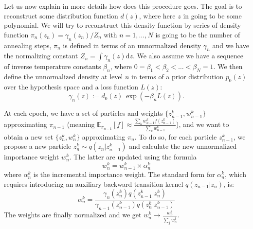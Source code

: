 \documentclass[11pt]{article}
\begin{document}
		Let us now explain in more details how does this procedure goes. The goal is to reconstruct some distribution function $d(z)$, where here $z$ in going to be some polynomial. We will try to reconstruct this density function by series of density function $\pi_n(z_n) = \gamma_n(z_n)/Z_n$ with $n = 1,\dots,N$ is going to be the number of annealing steps, $\pi_n$ is defined in terms of an unnormalized density $\gamma_n$ and we have the normalizing constant $Z_n = \int \gamma_n(z) \mathrm{d}z$. We also assume we have a sequence of inverse temperature constants $\beta_n$, where $0 = \beta_1 < \beta_2 <\dots< \beta_N = 1$. We then define the unnormalized density at level $n$ in terms of a prior distribution $p_0(z)$ over the hypothesis space and a loss function $L(z)$:
		\begin{equation}\label{eq:gamman}
			\gamma_n(z) := d_0(z) \: \exp \left( -\beta_n L(z) \right).
		\end{equation} 
		
		At each epoch, we have a set of particles and weights $\{z_{n-1}^k, w_{n-1}^k\}$ approximating $\pi_{n-1}$ (meaning $\mathbb{E}_{\pi_{n-1}}[f] \approx \frac{\sum_k w_{n-1}^k f(z_{n-1}^k)}{\sum_k w_{n-1}^k}$), and we want to obtain a new set $\{z_n^k, w_n^k\}$ approximating $\pi_n$. To do so, for each particle $z^k_{n-1}$, we propose a new particle $z_n^k \sim q(z_n | z_{n-1}^k)$ and calculate the new unnormalized importance weight $w_n^k$. The latter are updated using the formula 
		\begin{equation}
			w_n^k = w_{n-1}^k \times \alpha_{n}^k
		\end{equation}
		where $\alpha_n^k$ is the incremental importance weight. The standard form for $\alpha_n^k$, which requires introducing an auxiliary backward transition kernel $q(z_{n-1} | z_n)$, is:
		\begin{equation}
			\alpha_n^k = \frac{ \gamma_n(z_n^k) q(z_{n-1}^k | z_n^k) }{ \gamma_{n-1}(z_{n-1}^k) q(z_n^k | z_{n-1}^k) } 
		\end{equation}
		The weights are finally normalized and we get $w_n^k \rightarrow \frac{w_n^k}{\sum_j w_n^j}$.
		
\end{document}
